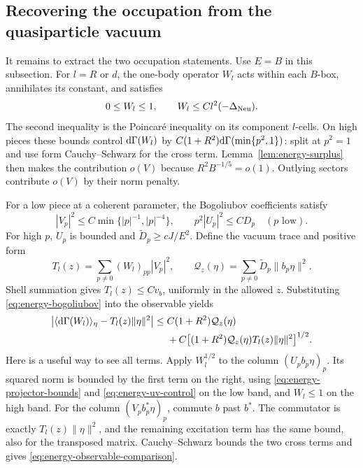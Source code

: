 \subsection{Recovering the occupation from the quasiparticle vacuum}

It remains to extract the two occupation statements.  Use $E=B$ in
this subsection.  For $l=R$ or $d$, the one-body operator $W_l$ acts
within each $B$-box, annihilates its constant, and satisfies
\begin{equation}\label{eq:energy-projector-bounds}
 0\le W_l\le1,\qquad W_l\le Cl^2(-\Delta_{\rm Neu}).
\end{equation}
The second inequality is the Poincar\'e inequality on its component
$l$-cells.  On high pieces these bounds control $\mathrm d\Gamma(W_l)$ by
$C(1+R^2)\mathrm d\Gamma(\min\{p^2,1\})$: split at $p^2=1$ and use form
Cauchy--Schwarz for the cross term.  Lemma~\ref{lem:energy-surplus}
then makes the contribution $o(V)$ because $R^2B^{-1/5}=o(1)$.
Outlying sectors contribute $o(V)$ by their norm penalty.

For a low piece at a coherent parameter, the Bogoliubov coefficients
satisfy
\begin{equation}\label{eq:energy-uv-control}
 |V_p|^2\le C\min\{|p|^{-1},|p|^{-4}\},\qquad
 p^2|U_p|^2\le CD_p\quad(p\text{ low}).
\end{equation}
For high $p$, $U_p$ is bounded and
$\widetilde D_p\ge cJ/E^2$.  Define the vacuum trace and positive form
\[
 T_l(z)=\sum_{p\ne0}(W_l)_{pp}|V_p|^2,\qquad
 \mathcal Q_z(\eta)=\sum_{p\ne0}\widetilde D_p\|b_p\eta\|^2.
\]
Shell summation gives $T_l(z)\le Cv_b$, uniformly in the allowed $z$.
Substituting \eqref{eq:energy-bogoliubov} into the observable yields
\begin{equation}\label{eq:energy-observable-comparison}
\begin{split}
 \left|\langle\mathrm d\Gamma(W_l)\rangle_\eta-T_l(z)\|\eta\|^2\right|
 \le{}&C(1+R^2)\mathcal Q_z(\eta)\\
 &+C\bigl[(1+R^2)\mathcal Q_z(\eta)T_l(z)\|\eta\|^2\bigr]^{1/2}.
\end{split}
\end{equation}
Here is a useful way to see all terms.  Apply $W_l^{1/2}$ to the
column $(U_pb_p\eta)_p$.  Its squared norm is bounded by the first
term on the right, using \eqref{eq:energy-projector-bounds} and
\eqref{eq:energy-uv-control} on the low band, and $W_l\le1$ on the
high band.  For the column $(V_pb_p^*\eta)_p$, commute $b$ past $b^*$.
The commutator is exactly $T_l(z)\|\eta\|^2$, and the remaining
excitation term has the same bound, also for the transposed matrix.
Cauchy--Schwarz bounds the two cross terms and gives
\eqref{eq:energy-observable-comparison}.

